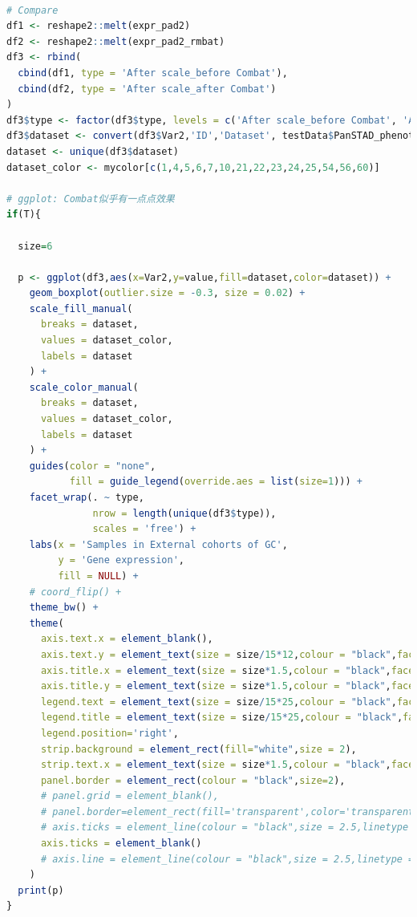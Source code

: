 \documentclass[
  12pt,
]{book}
\begin{document}
\begin{lstlisting}[language=R]

# Compare
df1 <- reshape2::melt(expr_pad2)
df2 <- reshape2::melt(expr_pad2_rmbat)
df3 <- rbind(
  cbind(df1, type = 'After scale_before Combat'),
  cbind(df2, type = 'After scale_after Combat')
)
df3$type <- factor(df3$type, levels = c('After scale_before Combat', 'After scale_after Combat'))
df3$dataset <- convert(df3$Var2,'ID','Dataset', testData$PanSTAD_phenotype_part)
dataset <- unique(df3$dataset)
dataset_color <- mycolor[c(1,4,5,6,7,10,21,22,23,24,25,54,56,60)]

# ggplot: Combat似乎有一点点效果
if(T){
  
  size=6
  
  p <- ggplot(df3,aes(x=Var2,y=value,fill=dataset,color=dataset)) + 
    geom_boxplot(outlier.size = -0.3, size = 0.02) + 
    scale_fill_manual(
      breaks = dataset,
      values = dataset_color,
      labels = dataset
    ) + 
    scale_color_manual(
      breaks = dataset,
      values = dataset_color,
      labels = dataset
    ) + 
    guides(color = "none",
           fill = guide_legend(override.aes = list(size=1))) + 
    facet_wrap(. ~ type, 
               nrow = length(unique(df3$type)),
               scales = 'free') +
    labs(x = 'Samples in External cohorts of GC',
         y = 'Gene expression',
         fill = NULL) +
    # coord_flip() + 
    theme_bw() +
    theme(
      axis.text.x = element_blank(),
      axis.text.y = element_text(size = size/15*12,colour = "black",face = "bold"),
      axis.title.x = element_text(size = size*1.5,colour = "black",face = "bold"),
      axis.title.y = element_text(size = size*1.5,colour = "black",face = "bold"),
      legend.text = element_text(size = size/15*25,colour = "black",face = "bold"),
      legend.title = element_text(size = size/15*25,colour = "black",face = "bold"),
      legend.position='right',
      strip.background = element_rect(fill="white",size = 2),
      strip.text.x = element_text(size = size*1.5,colour = "black",face = "bold", margin = margin(t = 0.5, r = 0, b = 0.5, l = 0, unit = "cm")),
      panel.border = element_rect(colour = "black",size=2),
      # panel.grid = element_blank(),
      # panel.border=element_rect(fill='transparent',color='transparent'),
      # axis.ticks = element_line(colour = "black",size = 2.5,linetype = 1,lineend = 'square'),
      axis.ticks = element_blank()
      # axis.line = element_line(colour = "black",size = 2.5,linetype = 1,lineend = 'square')
    ) 
  print(p)
}
\end{lstlisting}
\end{document}
